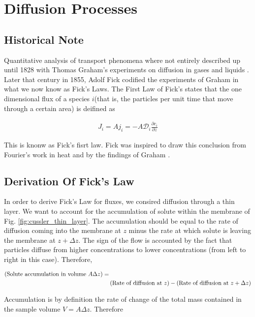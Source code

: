 \section{Diffusion Processes}


\subsection{Historical Note}

\par Quantitative analysis of transport phenomena where not entirely described up until 1828 with Thomas Graham's experiments on diffusion in gases and liquids \cite{cussler}. Later that century in 1855, Adolf Fick codified the experiments of Graham in what we now know as Fick's Laws. The First Law of Fick's states that the one dimensional flux of a species $i$(that is, the particles per unit time that move through a certain area) is deifined as \cite{cussler}

\begin{align}
\label{eq:fick-fluxes}
	J_i = A j_i = -A\mathcal{D}_i\frac{\partial c_i}{\partial z} 
\end{align}

This is knonw as Fick's fisrt law. Fick was inspired to draw this conclusion from Fourier's work in heat and by the findings of Graham \cite{fick}.


\subsection{Derivation Of Fick's Law}

In order to derive Fick's Law for fluxes, we consired diffusion through a thin layer. We want to account for the accumulation of solute within the membrane of Fig. \ref{fig:cussler_thin_layer}. The accumulation should be equal to the rate of diffusion coming into the membrane at $z$ minus the rate at which solute is leaving the membrane at $z+\Delta z$. The sign of the flow is accounted by the fact that particles diffuse from higher concentrations to lower concentrations (from left to right in this case). Therefore,

\begin{align}
	\left({\textnormal{Solute accumulation in volume }A\Delta z}\right) =& \\&\left({\textnormal{Rate of diffusion at } z }\right) - \left({\textnormal{Rate of diffusion at } z+\Delta z}\right)
\end{align}


Accumulation is by definition the rate of change of the total mass contained in the sample volume $V = A\Delta z$. Therefore

